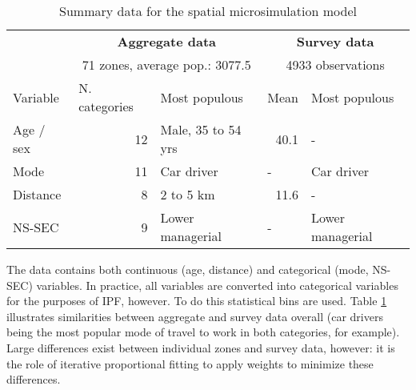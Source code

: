\begin{table}[htbp]
\caption{Summary data for the spatial microsimulation model}
\begin{center}
\begin{tabular}{lrlll}
\toprule
 & \multicolumn{ 2}{c}{\textbf{Aggregate data}} & \multicolumn{
2}{c}{\textbf{Survey data}} \\
 & \multicolumn{ 2}{c}{71 zones, average pop.: 3077.5} & \multicolumn{
2}{c}{4933 observations} \\ \midrule
Variable & \multicolumn{1}{l}{N. categories} & Most populous  & Mean  &
Most populous \\ \hline
Age / sex  & 12 & Male, 35 to 54 yrs & \multicolumn{1}{r}{40.1} & - \\
Mode  & 11 & Car driver & - & Car driver \\
Distance  & 8 & 2 to 5 km & \multicolumn{1}{r}{11.6} & - \\
NS-SEC  & 9 & Lower managerial & - & Lower managerial \\ \bottomrule
\end{tabular}\end{center}
\label{t:data}
\end{table}

The data contains both continuous (age, distance) and categorical (mode,
NS-SEC) variables. In practice, all variables are converted into categorical
variables for the purposes of IPF, however. To do this statistical
bins are used.
Table \ref{t:data} illustrates similarities between aggregate
and survey data overall (car drivers being the most popular mode of travel to
work in both categories, for example). Large differences exist between
individual zones and survey data, however: it is the role of iterative
proportional fitting to apply weights to minimize these differences.

